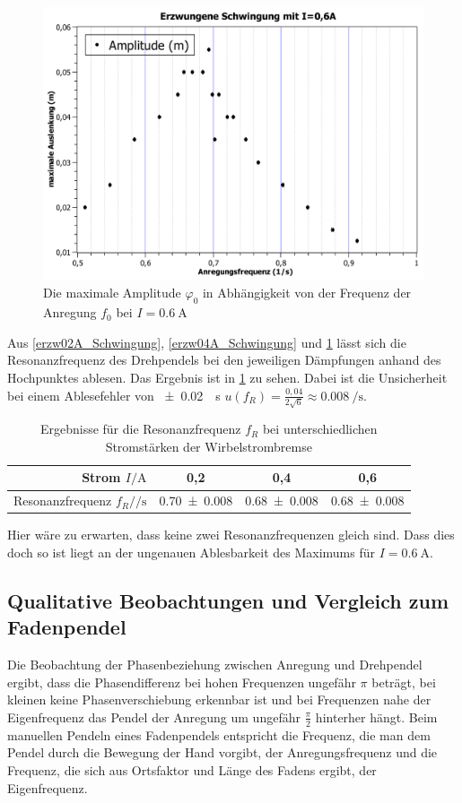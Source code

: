 \documentclass[
	a4paper,
	12pt,
	pagesize,
	ngerman
]{scrartcl}
\begin{document}
	\begin{figure}[htb]
		\includegraphics[width=1\textwidth]{erzwungene_Schwingung_0,6A}
		\centering
		\caption{Die maximale Amplitude $ \varphi_0 $ in Abhängigkeit von der Frequenz der Anregung $ f_0 $  bei $I=\SI{0,6}{\ampere}$}
		\label{erzw06A_Schwingung}
		\centering
	\end{figure}
	Aus \cref{erzw02A_Schwingung}, \cref{erzw04A_Schwingung} und \cref{erzw06A_Schwingung} lässt sich die Resonanzfrequenz des Drehpendels bei den jeweiligen Dämpfungen anhand des Hochpunktes ablesen. Das Ergebnis ist in \cref{erzwTab} zu sehen. Dabei ist die Unsicherheit bei einem Ablesefehler von \SI{\pm 0,02}{\per \second} $u(f_R)=\frac{0,04}{2\sqrt{6}} \approx \SI{0,008}{\per \second}$. 
	\begin{table}[htb]
		\centering
		\begin{tabular}{ r | c | c | c |}
			Strom $I /\si{\ampere}$& 0,2 & 0,4 & 0,6\\ \hline
			Resonanzfrequenz $ f_R / \si{\per \second}$& \num{0,70 \pm 0,008} & \num{0,68 \pm 0,008} & \num{0,68 \pm 0,008}
		\end{tabular}
		\caption{Ergebnisse für die Resonanzfrequenz $ f_R $ bei unterschiedlichen Stromstärken der Wirbelstrombremse}
		\label{erzwTab}
	\end{table}
	Hier wäre zu erwarten, dass keine zwei Resonanzfrequenzen gleich sind. Dass dies doch so ist liegt an der ungenauen Ablesbarkeit des Maximums für $I = \SI{0,6}{\ampere}$.
	
	\subsection{Qualitative Beobachtungen und Vergleich zum Fadenpendel}
	Die Beobachtung der Phasenbeziehung zwischen Anregung und Drehpendel ergibt, dass die Phasendifferenz bei hohen Frequenzen ungefähr $ \pi $  beträgt, bei kleinen keine Phasenverschiebung erkennbar ist und bei Frequenzen nahe der Eigenfrequenz das Pendel der Anregung um ungefähr $ \frac{\pi}{2} $ hinterher hängt. Beim manuellen Pendeln eines Fadenpendels entspricht die Frequenz, die man dem Pendel durch die Bewegung der Hand vorgibt, der Anregungsfrequenz und die Frequenz, die sich aus Ortsfaktor und Länge des Fadens ergibt, der Eigenfrequenz.
\end{document}
